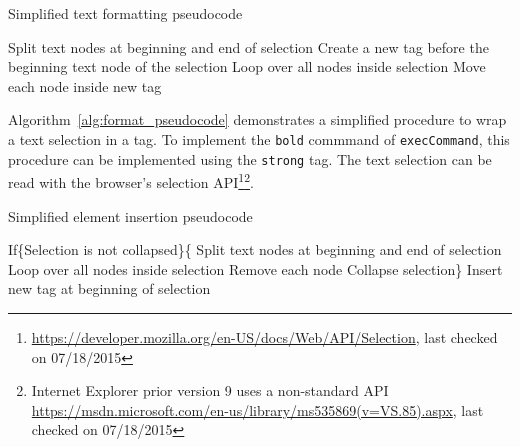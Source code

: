 \begin{algorithm}
\caption{Simplified text formatting pseudocode}
\label{alg:format_pseudocode}
\begin{algorithmic}[1]
\State Split text nodes at beginning and end of selection
\State Create a new tag before the beginning text node of the selection
\State Loop over all nodes inside selection
\State Move each node inside new tag
\end{algorithmic}
\end{algorithm}


Algorithm~\ref{alg:format_pseudocode} demonstrates a simplified procedure to wrap a text selection in a tag. To implement the \texttt{bold} commmand of \texttt{execCommand}, this procedure can be implemented using the \texttt{strong} tag. The text selection can be read with the browser's selection API\footnote{\url{https://developer.mozilla.org/en-US/docs/Web/API/Selection}, last checked on 07/18/2015}\footnote{Internet Explorer prior version 9 uses a non-standard API \url{https://msdn.microsoft.com/en-us/library/ms535869(v=VS.85).aspx}, last checked on 07/18/2015}.


\begin{algorithm}
\caption{Simplified element insertion pseudocode}
\label{alg:insert_pseudocode}
\begin{algorithmic}[1]
\State If\{Selection is not collapsed\}\{
\State Split text nodes at beginning and end of selection
\State Loop over all nodes inside selection
\State Remove each node
\State Collapse selection\}
\State Insert new tag at beginning of selection
\end{algorithmic}
\end{algorithm}

